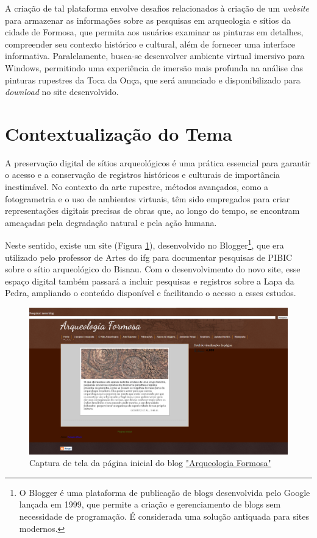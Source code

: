 A criação de tal plataforma envolve desafios relacionados à criação de um \textit{website} para armazenar as informações sobre as pesquisas em arqueologia e sítios da cidade de Formosa, que permita aos usuários examinar as pinturas em detalhes, compreender seu contexto histórico e cultural, além de fornecer uma interface informativa. Paralelamente, busca-se desenvolver ambiente virtual imersivo para Windows, permitindo uma experiência de imersão mais profunda na análise das pinturas rupestres da Toca da Onça, que será anunciado e disponibilizado para \textit{download} no site desenvolvido. 


\section{Contextualização do Tema}
A preservação digital de sítios arqueológicos é uma prática essencial para garantir o acesso e a conservação de registros históricos e culturais de importância inestimável. No contexto da arte rupestre, métodos avançados, como a fotogrametria e o uso de ambientes virtuais, têm sido empregados para criar representações digitais precisas de obras que, ao longo do tempo, se encontram ameaçadas pela degradação natural e pela ação humana.

Neste sentido, existe um site (Figura \ref{fig:Captura de tela da página inicial do blog}), desenvolvido no Blogger\footnote{O Blogger é uma plataforma de publicação de blogs desenvolvida pelo Google lançada em 1999, que permite a criação e gerenciamento de blogs sem necessidade de programação. É considerada uma solução antiquada para sites modernos.}, que era utilizado pelo professor de Artes do \gls{ifg} para documentar pesquisas de PIBIC sobre o sítio arqueológico do Bisnau. Com o desenvolvimento do novo site, esse espaço digital também passará a incluir pesquisas e registros sobre a Lapa da Pedra, ampliando o conteúdo disponível e facilitando o acesso a esses estudos.

\begin{figure}
    \centering
    \includegraphics[width=1\linewidth]{images/home-blog-print.png}
    \caption{Captura de tela da página inicial do blog \href{https://arqueologiaformosa.blogspot.com/}{"Arqueologia Formosa"}}
    \label{fig:Captura de tela da página inicial do blog}
\end{figure}

